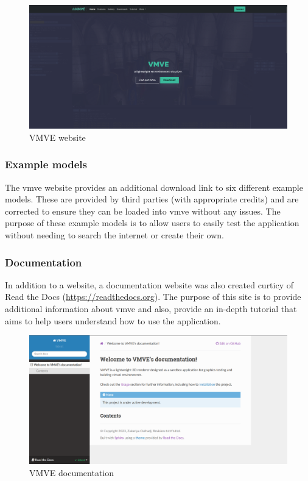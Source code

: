 \documentclass[11pt]{article}
\begin{document}
\begin{figure}[h!]
  \centering
  \includegraphics[width=\textwidth]{images/website.png}
  \caption{VMVE website}
  \label{fig:website}
\end{figure}


\subsubsection{Example models}
The \gls{vmve} website provides an additional download link to six different example
models. These are provided by third parties (with appropriate credits) and are
corrected to ensure they can be loaded into \gls{vmve} without any issues. The purpose
of these example models is to allow users to easily test the application without
needing to search the internet or create their own.


\subsubsection{Documentation}
In addition to a website, a documentation website was also created curticy of
Read the Docs (\href{https://readthedocs.org}{https://readthedocs.org}). The
purpose of this site is to provide additional information about \gls{vmve} and
also, provide an in-depth tutorial that aims to help users understand how to use
the application.

\begin{figure}[h!]
  \centering
  \includegraphics[width=\textwidth]{images/documentation.png}
  \caption{VMVE documentation}
  \label{fig:documentation}
\end{figure}
\end{document}
